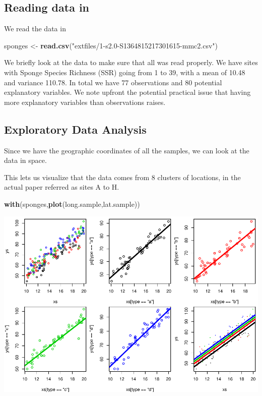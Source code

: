 \documentclass[
]{book}
\newenvironment{Shaded}{\begin{snugshade}}{\end{snugshade}}
\newcommand{\FunctionTok}[1]{\textcolor[rgb]{0.13,0.29,0.53}{\textbf{#1}}}
\newcommand{\NormalTok}[1]{#1}
\newcommand{\OtherTok}[1]{\textcolor[rgb]{0.56,0.35,0.01}{#1}}
\newcommand{\StringTok}[1]{\textcolor[rgb]{0.31,0.60,0.02}{#1}}
\begin{document}
\hypertarget{reading-data-in}{%
\subsection{Reading data in}\label{reading-data-in}}

We read the data in

\begin{Shaded}
\begin{Highlighting}[]
\NormalTok{sponges }\OtherTok{\textless{}{-}} \FunctionTok{read.csv}\NormalTok{(}\StringTok{"extfiles/1{-}s2.0{-}S1364815217301615{-}mmc2.csv"}\NormalTok{)}
\end{Highlighting}
\end{Shaded}

We briefly look at the data to make sure that all was read properly. We have sites with Sponge Species Richness (SSR) going from 1 to 39, with a mean of 10.48 and variance 110.78. In total we have 77 observations and 80 potential explanatory variables. We note upfront the potential practical issue that having more explanatory variables than observations raises.

\hypertarget{exploratory-data-analysis}{%
\subsection{Exploratory Data Analysis}\label{exploratory-data-analysis}}

Since we have the geographic coordinates of all the samples, we can look at the data in space.

This lets us visualize that the data comes from 8 clusters of locations, in the actual paper referred as sites A to H.

\begin{Shaded}
\begin{Highlighting}[]
\FunctionTok{with}\NormalTok{(sponges,}\FunctionTok{plot}\NormalTok{(long.sample,lat.sample)) }
\end{Highlighting}
\end{Shaded}

\includegraphics{ECOMODbook_files/figure-latex/unnamed-chunk-86-1.pdf}
\end{document}
